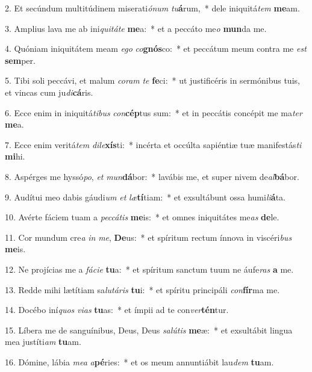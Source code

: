 2. Et secúndum multitúdinem miserati\textit{ó}\textit{num} \textit{tu}\textbf{á}rum,~*  dele iniquitá\textit{tem} \textbf{me}am.\

3. Amplius lava me ab ini\textit{qui}\textit{tá}\textit{te} \textbf{me}a:~*  et a peccáto me\textit{o} \textbf{mun}da me.\

4. Quóniam iniquitátem meam \textit{e}\textit{go} \textit{co}\textbf{gnós}co:~*  et peccátum meum contra me \textit{est} \textbf{sem}per.\

5. Tibi soli peccávi, et malum \textit{co}\textit{ram} \textit{te} \textbf{fe}ci:~*  ut justificéris in sermónibus tuis, et vincas cum ju\textit{di}\textbf{cá}ris.\

6. Ecce enim in iniquitá\textit{ti}\textit{bus} \textit{con}\textbf{cép}tus sum:~*  et in peccátis concépit me ma\textit{ter} \textbf{me}a.\

7. Ecce enim veritá\textit{tem} \textit{di}\textit{le}\textbf{xís}ti:~*  incérta et occúlta sapiéntiæ tuæ manifestás\textit{ti} \textbf{mi}hi.\

8. Aspérges me hyssó\textit{po}, \textit{et} \textit{mun}\textbf{dá}bor:~*  lavábis me, et super nivem de\textit{al}\textbf{bá}bor.\

9. Audítui meo dabis gáudi\textit{um} \textit{et} \textit{læ}\textbf{tí}tiam:~*  et exsultábunt ossa humi\textit{li}\textbf{á}ta.\

10. Avérte fáciem tuam a \textit{pec}\textit{cá}\textit{tis} \textbf{me}is:~*  et omnes iniquitátes me\textit{as} \textbf{de}le.\

11. Cor mundum cre\textit{a} \textit{in} \textit{me}, \textbf{De}us:~*  et spíritum rectum ínnova in viscéri\textit{bus} \textbf{me}is.\

12. Ne projícias me a \textit{fá}\textit{ci}\textit{e} \textbf{tu}a:~*  et spíritum sanctum tuum ne áufe\textit{ras} \textbf{a} me.\

13. Redde mihi lætítiam sa\textit{lu}\textit{tá}\textit{ris} \textbf{tu}i:~*  et spíritu principáli \textit{con}\textbf{fír}ma me.\

14. Docébo iní\textit{quos} \textit{vi}\textit{as} \textbf{tu}as:~*  et ímpii ad te con\textit{ver}\textbf{tén}tur.\

15. Líbera me de sanguínibus, Deus, Deus \textit{sa}\textit{lú}\textit{tis} \textbf{me}æ:~*  et exsultábit lingua mea justíti\textit{am} \textbf{tu}am.\

16. Dómine, lábia \textit{me}\textit{a} \textit{a}\textbf{pé}ries:~*  et os meum annuntiábit lau\textit{dem} \textbf{tu}am.\

